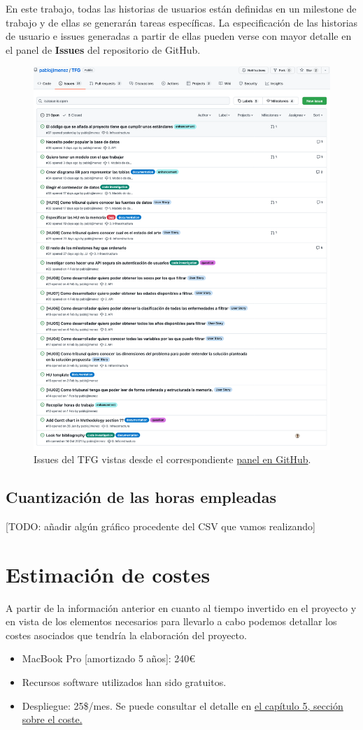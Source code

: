 En este trabajo, todas las historias de usuarios están definidas en un milestone de
trabajo y de ellas se generarán tareas específicas. La especificación de las historias de
usuario e issues generadas a partir de ellas pueden verse con mayor detalle en el panel de
\textbf{Issues} del repositorio de GitHub.
\begin{figure}[]
	\centering
	\includegraphics[scale=0.3]{doc/logos/imgs/issues.png}
	\caption{ Issues del TFG vistas desde el correspondiente
	\href{https://github.com/pablojjimenez/TFG/issues}{panel en GitHub}. }
    \label{fig:worst_f_value}
\end{figure}

\subsection{Cuantización de las horas empleadas}
[TODO: añadir algún gráfico procedente del CSV que vamos realizando]

\section{Estimación de costes}
A partir de la información anterior en cuanto al tiempo invertido en el proyecto y en
vista de los elementos necesarios para llevarlo a cabo podemos detallar los costes
asociados que tendría la elaboración del proyecto.

\begin{itemize}
    \item MacBook Pro [amortizado 5 años]: 240€
    \item Recursos software utilizados han sido gratuitos.
    \item Despliegue: 25\$/mes. Se puede consultar el detalle en
    \hyperref[sec:despliegue]{el capítulo 5, sección sobre el coste.}
\end{itemize}
